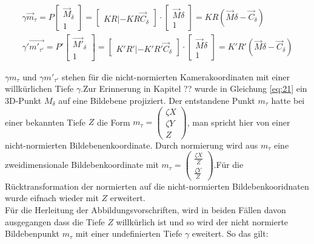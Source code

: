 \begin{gather}
	\gamma \vec{m}_\tau = P \begin{bmatrix}\vec{M}_\delta\\1\end{bmatrix} = 
	\begin{bmatrix}KR|-KR\vec{C}_\delta\end{bmatrix}\cdot \begin{bmatrix}\vec{M}\delta\\1\end{bmatrix} = KR(\vec{M}\delta - \vec{C}_\delta)\\
	\gamma' \vec{m'_{\tau'}} = P' \begin{bmatrix}\vec{M'}_\delta\\1\end{bmatrix} = 
	\begin{bmatrix}K'R'|-K'R'\vec{C}_\delta\end{bmatrix}\cdot \begin{bmatrix}\vec{M}\delta\\1\end{bmatrix} = K'R'(\vec{M}\delta - \vec{C}_\delta)
\end{gather}


$\gamma m_\tau$ und $\gamma m'_{\tau'}$ stehen für die nicht-normierten Kamerakoordinaten mit einer willkürlichen Tiefe $\gamma$.Zur Erinnerung in Kapitel ?? wurde in Gleichung \ref{eq:21} ein 3D-Punkt $M_\delta$ auf eine Bildebene projiziert. Der entstandene Punkt $m_\tau$ hatte bei einer bekannten Tiefe $Z$ die Form $	m_\tau = \begin{pmatrix}
\zeta X\\ \zeta Y\\Z
\end{pmatrix} $, man spricht hier von einer nicht-normierten Bildebenenkoordinate. Durch normierung wird aus $m_\tau$ eine zweidimensionale Bildebenkoordinate mit $m_\tau = \begin{pmatrix}
\frac{\zeta X}{Z}\\ \frac{\zeta Y}{Z}
\end{pmatrix}$.Für die Rücktransformation der normierten auf die nicht-normierten Bildebenkooridnaten wurde eifnach wieder mit $Z$ erweitert.\\

Für die Herleitung der Abbildungsvorschriften, wird in beiden Fällen davon ausgegangen dass die Tiefe $Z$ willkürlich ist und so wird der nicht normierte Bildebenpunkt $m_\tau$ mit einer undefinierten Tiefe $\gamma$ eweitert\cite{Elements}. So das gilt:

